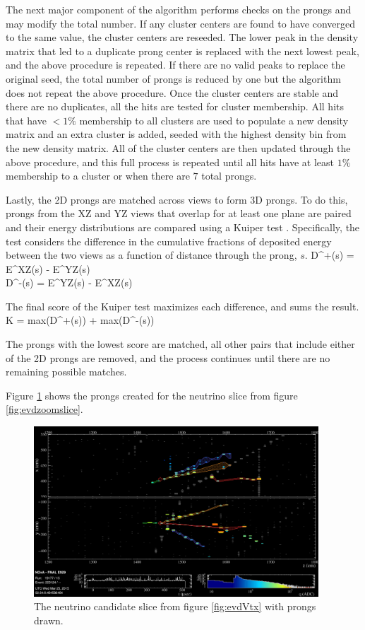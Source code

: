 The next major component of the algorithm performs checks on the prongs and may modify the total number. If any cluster centers are found to have converged to the same value, the cluster centers are reseeded. The lower peak in the density matrix that led to a duplicate prong center is replaced with the next lowest peak, and the above procedure is repeated. If there are no valid peaks to replace the original seed, the total number of prongs is reduced by one but the algorithm does not repeat the above procedure. Once the cluster centers are stable and there are no duplicates, all the hits are tested for cluster membership. All hits that have $< 1\%$ membership to all clusters are used to populate a new density matrix and an extra cluster is added, seeded with the highest density bin from the new density matrix. All of the cluster centers are then updated through the above procedure, and this full process is repeated until all hits have at least $1\%$ membership to a cluster or when there are $7$ total prongs.

Lastly, the 2D prongs are matched across views to form 3D prongs. To do this, prongs from the XZ and YZ views that overlap for at least one plane are paired and their energy distributions are compared using a Kuiper test \cite{ref:Kuiper}. Specifically, the test considers the difference in the cumulative fractions of deposited energy between the two views as a function of distance through the prong, $s$.
\beqa
D^+(s) = E^{XZ}(s) - E^{YZ}(s) \nonumber\\
D^-(s) = E^{YZ}(s) - E^{XZ}(s)
\label{eq:FuzzyDs}
\eeqa

\n The final score of the Kuiper test maximizes each difference, and sums the result.
\beq
K = \mbox{max}(D^+(s)) + \mbox{max}(D^-(s))
\label{eq:Kuiper}
\eeq

\n The prongs with the lowest score are matched, all other pairs that include either of the 2D prongs are removed, and the process continues until there are no remaining possible matches.

Figure \ref{fig:evdProng} shows the prongs created for the neutrino slice from figure \ref{fig:evdzoomslice}.
\begin{figure}[htb]
  \centering
  \includegraphics[width=0.95\textwidth]{figures/evd/ZoomVtxProng.png}
  \caption[An Example Neutrino Candidate Slice with Prongs]{The neutrino candidate slice from figure \ref{fig:evdVtx} with prongs drawn.}
  \label{fig:evdProng}
\end{figure}

